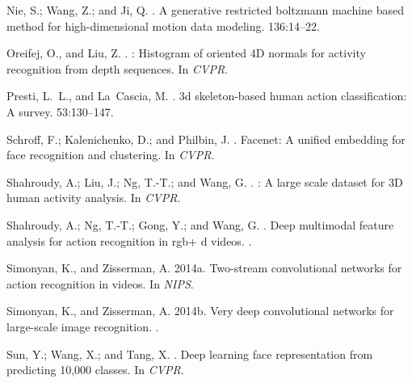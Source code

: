 \documentclass[letterpaper]{article} %
\begin{document}
\begin{thebibliography}{}
Nie, S.; Wang, Z.; and Ji, Q.
.
\newblock A generative restricted boltzmann machine based method for
  high-dimensional motion data modeling.
 136:14--22.

Oreifej, O., and Liu, Z.
.
: Histogram of oriented {4D} normals for activity recognition
  from depth sequences.
\newblock In {\em CVPR}.

Presti, L.~L., and La~Cascia, M.
.
\newblock 3d skeleton-based human action classification: A survey.
 53:130--147.

Schroff, F.; Kalenichenko, D.; and Philbin, J.
.
\newblock Facenet: A unified embedding for face recognition and clustering.
\newblock In {\em CVPR}.

Shahroudy, A.; Liu, J.; Ng, T.-T.; and Wang, G.
.
: A large scale dataset for {3D} human activity analysis.
\newblock In {\em CVPR}.

Shahroudy, A.; Ng, T.-T.; Gong, Y.; and Wang, G.
.
\newblock Deep multimodal feature analysis for action recognition in rgb+ d
  videos.
.

Simonyan, K., and Zisserman, A.
\newblock 2014a.
\newblock Two-stream convolutional networks for action recognition in videos.
\newblock In {\em NIPS}.

Simonyan, K., and Zisserman, A.
\newblock 2014b.
\newblock Very deep convolutional networks for large-scale image recognition.
.

Sun, Y.; Wang, X.; and Tang, X.
.
\newblock Deep learning face representation from predicting 10,000 classes.
\newblock In {\em CVPR}.


\end{thebibliography}
\end{document}
